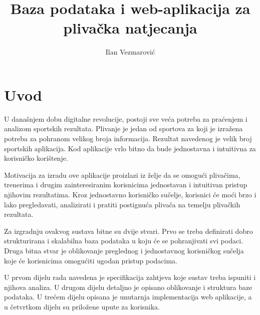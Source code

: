 \documentclass[times, utf8, zavrsni]{fer}
\begin{document}

\title{Baza podataka i web-aplikacija za plivačka natjecanja}

\author{Ilan Vezmarović}

\maketitle


\zahvala{}

\tableofcontents

\chapter{Uvod}
U današnjem dobu digitalne revolucije, postoji sve veća potreba za praćenjem i analizom sportskih rezultata. 
Plivanje je jedan od sportova za koji je izražena potreba za pohranom velikog broja informacija.
Rezultat navedenog je velik broj sportskih aplikacija. Kod aplikacije vrlo bitno da bude
jednostavna i intuitivna za korisničko korištenje.

\vspace{\baselineskip}

Motivacija za izradu ove aplikacije proizlazi iz želje da se omogući plivačima, trenerima i 
drugim zainteresiranim korisnicima jednostavan i intuitivan pristup njihovim rezultatima. 
Kroz jednostavno korisničko sučelje, korisnici će moći brzo i lako pregledavati, 
analizirati i pratiti postignuća plivača na temelju plivačkih rezultata.

\vspace{\baselineskip}

Za izgradnju ovakvog sustava bitne su dvije stvari. Prvo se treba definirati
dobro strukturirana i skalabilna baza podataka u koju će se pohranjivati svi podaci.
Druga bitna stvar je oblikovanje preglednog i jednostavnog korisničkog sučelja koje će
korisnicima omogućiti ugodan pristup podacima.

\vspace{\baselineskip}

U prvom dijelu rada navedena je specifikacija zahtjeva koje sustav treba ispuniti i njihova analiza.
U drugom dijelu detaljno je opisano oblikovanje i struktura baze podataka. U trećem dijelu opisana je unutarnja 
implementacija web aplikacije, a u četvrtkom dijelu su priložene upute za korisnika.
\end{document}
